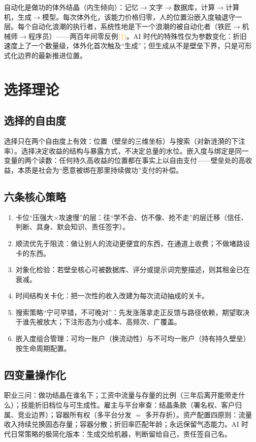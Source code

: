 \documentclass[11pt]{ctexart}
\newcommand{\infmark}{\textcolor{orange}{(\(\dagger\))}}
\begin{document}
自动化是做功的体外结晶（内生倾向）：记忆$\to$文字$\to$数据库，计算$\to$计算机，生成$\to$模型。每次体外化，该能力价格归零，人的位置沿嵌入度轴退守一层。每个自动化浪潮的执行者，系统性地是下一个浪潮的被自动化者（铁匠$\to$机械师$\to$程序员）——两百年间零反例\infmark。AI 时代的特殊性仅为参数变化：折旧速度上了一个数量级，体外化首次触及“生成”；但生成从不是壁垒下界，只是可形式化边界的最新推进位置。

\section{选择理论}
\subsection{选择的自由度}
选择只在两个自由度上有效：位置（壁垒的三维坐标）与搜索（对新涟漪的下注率）。选择决定收益的结构与暴露方式，不决定总量的水位。嵌入度与绑定是同一变量的两个读数：任何持久高收益的位置都在事实上以自由支付——壁垒处的高收益，本质是社会为“愿意被绑在那里持续做功”支付的补偿。

\subsection{六条核心策略}
\begin{enumerate}[leftmargin=2em]
\item 卡位“压强大$\times$攻速慢”的层：往“学不会、仿不像、抢不走”的层迁移（信任、判断、具身、默会知识、责任签字）。
\item 顺流优先于阻流：做让别人的流动更便宜的东西，在通道上收费；不做堵路设卡的东西。
\item 对象化检验：若壁垒核心可被数据库、评分或提示词完整描述，则其租金已在衰减。
\item 时间结构关卡化：把一次性的收入改建为每次流动抽成的关卡。
\item 搜索策略“宁可早错，不可晚对”：先发涨落拿走正反馈与路径依赖，期望取决于谁先被放大；下注形态为小成本、高频次、广覆盖。
\item 嵌入度组合管理：可均一账户（换流动性）与不可均一账户（持有持久壁垒）按生命周期配置。
\end{enumerate}

\subsection{四变量操作化}
职业三问：做功结晶在谁名下；工资中流量与存量的比例（三年后离开能带走什么）；技能折旧档位与可生成性。雇主与平台审查：结晶条款（署名权、客户归属、竞业边界）；容器所有权（多平台分发 $=$ 多开存折）。资产配置四原则：流量收入持续兑换固态存量；容器分散；折旧率匹配年龄；永远保留气态能力。AI 时代日常策略的极简化版本：生成交给机器，判断留给自己，责任签自己名。
\end{document}
